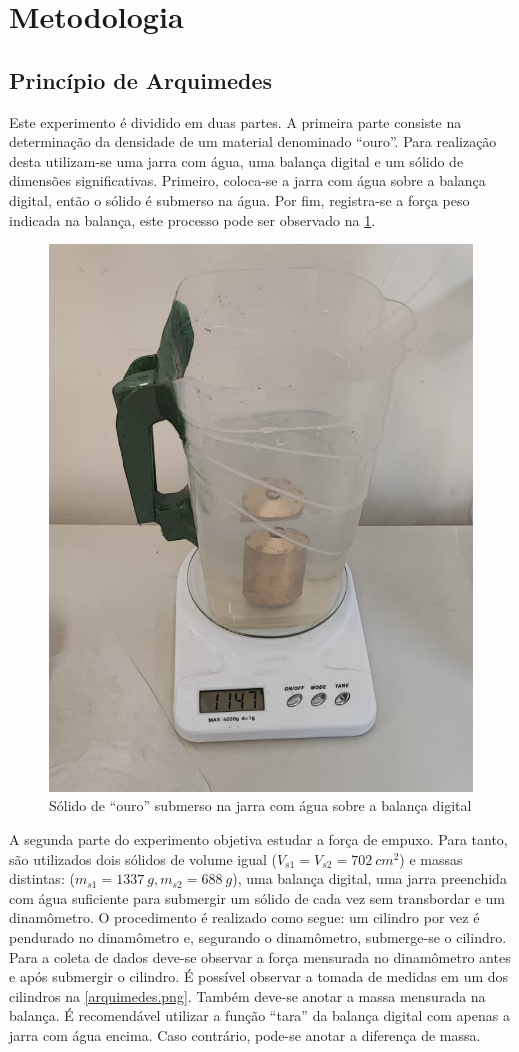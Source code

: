 \section{Metodologia}

\subsection{Princípio de Arquimedes}
Este experimento é dividido em duas partes. A primeira parte consiste na 
determinação da densidade de um material denominado ``ouro''. Para realização desta
utilizam-se uma jarra com água, uma balança digital e um sólido de dimensões 
significativas. Primeiro, coloca-se a jarra com água sobre a balança digital, 
então o sólido é submerso na água. Por fim, registra-se a força peso indicada na 
balança, este processo pode ser observado na \cref{ouro.png}.

\begin{figure}[H]
    \centering
    \includegraphics[width=.25\linewidth]{fig/ouro.jpeg}
    \caption{Sólido de ``ouro'' submerso na jarra com água sobre a balança digital}
    \label{ouro.png}
\end{figure}

A segunda parte do experimento objetiva estudar a força de empuxo. Para tanto,
são utilizados dois sólidos de volume igual (\(V_{s1} = V_{s2} = \qty{702}{cm ^2}\))
e massas distintas: (\(m_{s1} = \qty{1337}{g}, m_{s2} = \qty{688}{g}\)), uma balança 
digital, uma jarra preenchida com água suficiente para submergir um sólido de cada vez
sem transbordar e um dinamômetro. O procedimento é realizado como segue: um cilindro 
por vez é pendurado no dinamômetro e, segurando o dinamômetro, submerge-se o cilindro.
Para a coleta de dados deve-se observar a força mensurada no dinamômetro antes e após 
submergir o cilindro. É possível observar a tomada de medidas em um dos cilindros na \cref{arquimedes.png}.
Também deve-se anotar a massa mensurada na balança. É recomendável  utilizar a função ``tara'' da balança digital 
com apenas a jarra com água encima. Caso contrário,
pode-se anotar a diferença de massa.

